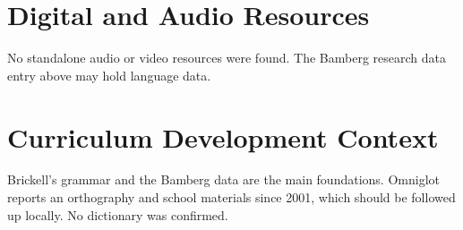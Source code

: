 \documentclass[12pt]{article}
\begin{document}
\section{Digital and Audio Resources}
No standalone audio or video resources were found. The Bamberg research data entry above may hold language data.
\section{Curriculum Development Context}
Brickell's grammar and the Bamberg data are the main foundations. Omniglot reports an orthography and school materials since 2001, which should be followed up locally. No dictionary was confirmed.
\end{document}
